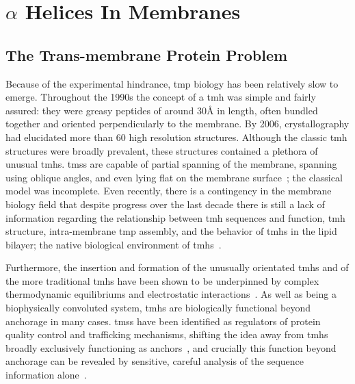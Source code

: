 \section{$\alpha$ Helices In Membranes }

\subsection{The Trans-membrane Protein Problem}

Because of the experimental hindrance, \gls{tmp} biology has been relatively slow to emerge. Throughout the 1990s the concept of a \gls{tmh} was simple and fairly assured: they were greasy peptides of around 30{\AA} in length, often bundled together and oriented perpendicularly to the membrane. By 2006, crystallography had elucidated more than 60 high resolution structures. Although the classic \gls{tmh} structures were broadly prevalent, these structures contained a plethora of unusual \gls{tmh}s. \gls{tms}s are capable of partial spanning of the membrane, spanning using oblique angles, and even lying flat on the membrane surface~\cite{VonHeijne2006, Elofsson2007}; the classical model was incomplete. Even recently, there is a contingency in the  membrane biology field that despite progress over the last decade there is still a lack of information regarding the relationship between \gls{tmh} sequences and function, \gls{tmh} structure, intra-membrane \gls{tmp} assembly, and the behavior of \gls{tmh}s in the lipid bilayer; the native biological environment of \gls{tmh}s~\cite{Ladokhin2015}.

Furthermore, the insertion and formation of the unusually orientated \gls{tmh}s and of the more traditional \gls{tmh}s have been shown to be underpinned by complex thermodynamic equilibriums and electrostatic interactions~\cite{Cymer2014, Elisa2012, Ismail2015}. As well as being a biophysically convoluted system, \gls{tmh}s are biologically functional beyond anchorage in many cases. \gls{tms}s have been identified as regulators of protein quality control and trafficking mechanisms, shifting the idea away from \gls{tmh}s broadly exclusively functioning as anchors~\cite{Hessa2011}, and crucially this function beyond anchorage can be revealed by sensitive, careful analysis of the sequence information alone~\cite{Wong2012}.


